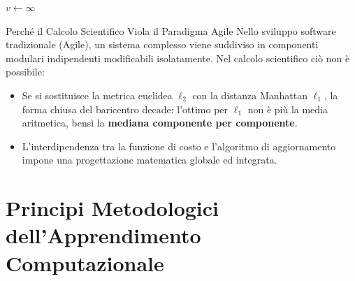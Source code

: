 \begin{algorithm}[H]
\caption{Algoritmo K-Means per Clustering Euclideo}\label{alg:kmeans}
$v \leftarrow \infty$\;
\;
\end{algorithm}

\begin{noteblock}{Perch\'e il Calcolo Scientifico Viola il Paradigma Agile}
Nello sviluppo software tradizionale (Agile), un sistema complesso viene suddiviso in componenti modulari indipendenti modificabili isolatamente. Nel calcolo scientifico ci\`o non \`e possibile:
\begin{itemize}
    \item Se si sostituisce la metrica euclidea $\ell_2$ con la distanza Manhattan $\ell_1$, la forma chiusa del baricentro decade: l'ottimo per $\ell_1$ non \`e pi\`u la media aritmetica, bens\`i la \textbf{mediana componente per componente}.
    \item L'interdipendenza tra la funzione di costo e l'algoritmo di aggiornamento impone una progettazione matematica globale ed integrata.
\end{itemize}
\end{noteblock}

\FloatBarrier
\section{Principi Metodologici dell'Apprendimento Computazionale}

